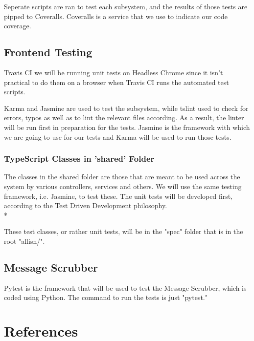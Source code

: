 \documentclass[11pt]{article}
\begin{document}
Seperate scripts are ran to test each subsystem, and the results of those tests are pipped to Coveralls. Coveralls is a service that we use to indicate our code coverage.

\subsection{Frontend Testing}

Travis CI we will be running unit tests on Headless Chrome\cite{Website:3} since it isn't practical to do them on a browser when Travis CI runs the automated test scripts.\par
Karma and Jasmine are used to test the subsystem, while tslint used to check for errors, typos as well as to lint the relevant files according. As a result, the linter will be run first in preparation for the tests. Jasmine is the framework with which we are going to use for our tests and Karma will be used to run those tests.

\subsubsection{TypeScript Classes in 'shared' Folder}

The classes in the shared folder are those that are meant to be used across the system by various controllers, services and others. We will use the same testing framework, i.e. Jasmine, to test these. The unit tests will be developed first, according to the Test Driven Development philosophy.\\*

These test classes, or rather unit tests, will be in the "spec" folder that is in the root "allisn/".

\subsection{Message Scrubber}

Pytest is the framework that will be used to test the Message Scrubber, which is coded using Python. The command to run the tests is just "pytest."

\section{References}


\end{document}

